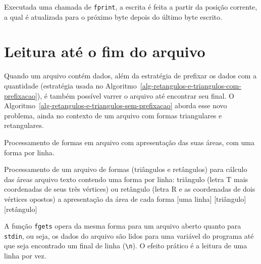 \documentclass[
  11pt,
  a4paper,
]{scrbook}
\begin{document}
Executada uma chamada de \texttt{fprint}, a escrita é feita a partir da
posição corrente, a qual é atualizada para o próximo byte depois do
último byte escrito.

\section{Leitura até o fim do
arquivo}\label{leitura-atuxe9-o-fim-do-arquivo}

Quando um arquivo contém dados, além da estratégia de prefixar os dados
com a quantidade (estratégia usada no
Algoritmo~\ref{alg-retangulos-e-triangulos-com-prefixacao}), é também
possível varrer o arquivo até encontrar seu final. O
Algoritmo~\ref{alg-retangulos-e-triangulos-sem-prefixacao} aborda esse
novo problema, ainda no contexto de um arquivo com formas triangulares e
retangulares.

\begin{algorithm}[H]
\caption{\label{alg-retangulos-e-triangulos-sem-prefixacao}Processamento
de formas em arquivo com apresentação das suas áreas, com uma forma por
linha.}
\begingroup%


\begin{algorithmic}
    \Description Processamento de um arquivo de formas (triângulos e retângulos) para cálculo das áreas
    \Require arquivo texto contendo uma forma por linha: triângulo (letra T mais coordenadas de seus três vértices) ou retângulo (letra R e as coordenadas de dois vértices opostos)
    \Ensure a apresentação da área de cada forma
    \Statex{}
        [uma linha]
            [triângulo]
        \Else
            [retângulo]
        \EndIf
    \EndWhile
\end{algorithmic}

\endgroup
\end{algorithm}

A função \texttt{fgets} opera da mesma forma para um arquivo aberto
quanto para \texttt{stdin}, ou seja, os dados do arquivo são lidos para
uma variável do programa até que seja encontrado um final de linha
(\texttt{\textbackslash{}n}). O efeito prático é a leitura de uma linha
por vez.
\end{document}
